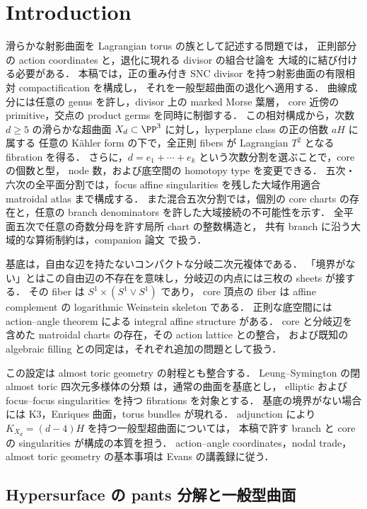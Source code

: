 \section{Introduction}

滑らかな射影曲面を Lagrangian torus の族として記述する問題では，
正則部分の action coordinates と，退化に現れる divisor の組合せ論を
大域的に結び付ける必要がある．
本稿では，正の重み付き SNC divisor を持つ射影曲面の有限相対 compactification を構成し，
それを一般型超曲面の退化へ適用する．
曲線成分には任意の genus を許し，divisor 上の marked Morse 葉層，
core 近傍の primitive，交点の product germs を同時に制御する．
この相対構成から，次数 $d\geq5$ の滑らかな超曲面
$X_d\subset\PP^3$ に対し，hyperplane class の正の倍数 $aH$ に属する
任意の Kähler form の下で，全正則 fibers が Lagrangian $T^2$ となる fibration を得る．
さらに，$d=e_1+\cdots+e_k$ という次数分割を選ぶことで，core の個数と型，
node 数，および底空間の homotopy type を変更できる．
五次・六次の全平面分割では，focus affine singularities を残した大域作用適合 matroidal atlas まで構成する．
また混合五次分割では，個別の core charts の存在と，任意の branch denominators を許した大域接続の不可能性を示す．
全平面五次で任意の奇数分母を許す局所 chart の整数構造と，
共有 branch に沿う大域的な算術制約は，companion 論文
\cite{QuinticArithmetic}で扱う．

基底は，自由な辺を持たないコンパクトな分岐二次元複体である．
「境界がない」とはこの自由辺の不存在を意味し，分岐辺の内点には三枚の sheets が接する．
その fiber は $S^1\times(S^1\vee S^1)$ であり，
core 頂点の fiber は affine complement の logarithmic Weinstein skeleton である．
正則な底空間には action--angle theorem による integral affine structure がある．
core と分岐辺を含めた matroidal charts の存在，その action lattice との整合，
および既知の algebraic filling との同定は，それぞれ追加の問題として扱う．

この設定は almost toric geometry の射程とも整合する．
Leung--Symington の閉 almost toric 四次元多様体の分類
\cite[Theorem 2.6, Table 1]{LeungSymington}は，通常の曲面を基底とし，
elliptic および focus--focus singularities を持つ fibrations を対象とする．
基底の境界がない場合には K3，Enriques 曲面，torus bundles が現れる．
adjunction により $K_{X_d}=(d-4)H$ を持つ一般型超曲面については，
本稿で許す branch と core の singularities が構成の本質を担う．
action--angle coordinates，nodal trade，almost toric geometry の基本事項は
Evans の講義録\cite{Evans}に従う．

\subsection{Hypersurface の pants 分解と一般型曲面}

